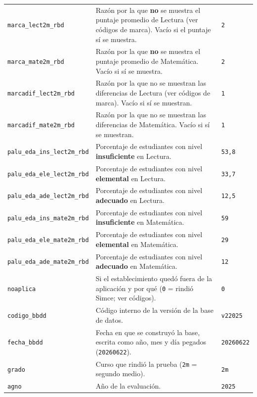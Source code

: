 \documentclass[10.5pt]{article}
\begin{document}
\begin{xltabular}{\linewidth}{@{}p{4.5cm} >{\raggedright\arraybackslash}X p{3.4cm}@{}}
\texttt{marca\_\allowbreak{}lect2m\_\allowbreak{}rbd} & Razón por la que \textbf{no} se muestra el puntaje promedio de Lectura (ver códigos de marca). Vacío si el puntaje sí se muestra. & \texttt{2} \\
\texttt{marca\_\allowbreak{}mate2m\_\allowbreak{}rbd} & Razón por la que \textbf{no} se muestra el puntaje promedio de Matemática. Vacío si sí se muestra. & \texttt{2} \\
\texttt{marcadif\_\allowbreak{}lect2m\_\allowbreak{}rbd} & Razón por la que no se muestran las diferencias de Lectura (ver códigos de marca). Vacío si sí se muestran. & \texttt{1} \\
\texttt{marcadif\_\allowbreak{}mate2m\_\allowbreak{}rbd} & Razón por la que no se muestran las diferencias de Matemática. Vacío si sí se muestran. & \texttt{1} \\
\texttt{palu\_\allowbreak{}eda\_\allowbreak{}ins\_\allowbreak{}lect2m\_\allowbreak{}rbd} & Porcentaje de estudiantes con nivel \textbf{insuficiente} en Lectura. & \texttt{53,8} \\
\texttt{palu\_\allowbreak{}eda\_\allowbreak{}ele\_\allowbreak{}lect2m\_\allowbreak{}rbd} & Porcentaje de estudiantes con nivel \textbf{elemental} en Lectura. & \texttt{33,7} \\
\texttt{palu\_\allowbreak{}eda\_\allowbreak{}ade\_\allowbreak{}lect2m\_\allowbreak{}rbd} & Porcentaje de estudiantes con nivel \textbf{adecuado} en Lectura. & \texttt{12,5} \\
\texttt{palu\_\allowbreak{}eda\_\allowbreak{}ins\_\allowbreak{}mate2m\_\allowbreak{}rbd} & Porcentaje de estudiantes con nivel \textbf{insuficiente} en Matemática. & \texttt{59} \\
\texttt{palu\_\allowbreak{}eda\_\allowbreak{}ele\_\allowbreak{}mate2m\_\allowbreak{}rbd} & Porcentaje de estudiantes con nivel \textbf{elemental} en Matemática. & \texttt{29} \\
\texttt{palu\_\allowbreak{}eda\_\allowbreak{}ade\_\allowbreak{}mate2m\_\allowbreak{}rbd} & Porcentaje de estudiantes con nivel \textbf{adecuado} en Matemática. & \texttt{12} \\
\texttt{noaplica} & Si el establecimiento quedó fuera de la aplicación y por qué (\texttt{0} = rindió Simce; ver códigos). & \texttt{0} \\
\texttt{codigo\_\allowbreak{}bbdd} & Código interno de la versión de la base de datos. & \texttt{v22025} \\
\texttt{fecha\_\allowbreak{}bbdd} & Fecha en que se construyó la base, escrita como año, mes y día pegados (\texttt{20260622}). & \texttt{20260622} \\
\texttt{grado} & Curso que rindió la prueba (\texttt{2m} = segundo medio). & \texttt{2m} \\
\texttt{agno} & Año de la evaluación. & \texttt{2025} \\
\end{xltabular}
\end{document}
